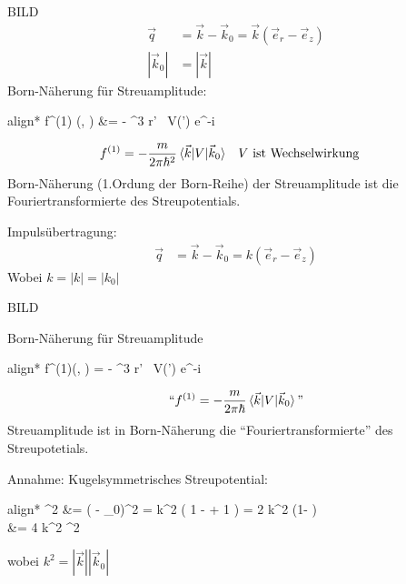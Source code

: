 	BILD
		\begin{align*}
			\vec{q} &= \vec{k} - \vec{k}_0 = \vec{k} (\vec{e}_r - \vec{e}_z) \\
			|\vec{k}_0| &= |\vec{k}|
		\end{align*}
	Born-Näherung für Streuamplitude:
		\begin{empheq}[box=\boxed]{align*}
			f^{(1)} (\Theta, \phi) &= - 
			\int \diff^3 r' ~V(') e^{-i  }
		\end{empheq}
		\begin{align*}
			f^{(1)} &= -\frac{m}{2 \pi \hbar^2}  \braket{\vec{k}| V | \vec{k}_0}
			& &V \text{ ist Wechselwirkung}
		\end{align*}
	Born-Näherung (1.Ordung der Born-Reihe) der Streuamplitude ist die Fouriertransformierte des Streupotentials.
	
	Impulsübertragung: 
		\begin{align*}
			\vec{q} &= \vec{k} - \vec{k}_0 
			= k (\vec{e}_r - \vec{e}_z)
		\end{align*}
	Wobei $k = |k| = |k_0|$
	
	BILD
	
	Born-Näherung für Streuamplitude
		\begin{empheq}[box=\boxed]{align*}
			f^{(1)}(\Theta, \phi) =
			- 
			\int \diff^3 r' ~V(') e^{-i  \cdot {}}
		\end{empheq} 
		\begin{align*}
			``f^{(1)} = -\frac{m}{2 \pi \hbar} 
			\braket{ \vec{k} | V | \vec{k}_0}\text{''}
		\end{align*}
	Streuamplitude ist in Born-Näherung die ``Fouriertransformierte'' des Streupotetials.
	
	Annahme: Kugelsymmetrisches Streupotential:
		\begin{empheq}[box=\boxed]{align*}
			^2 &= (\vec{k} - _0)^2 
			= k^2 \left( 1 - \frac{2  \vec{k}_0}{k^2}
			+ 1 \right)	
			= 2 k^2 (1- \cos \Theta) \\
			&= 4 k^2 \sin^2 
		\end{empheq}
	wobei $k^2 = |\vec{k}| |\vec{k}_0|$
	
